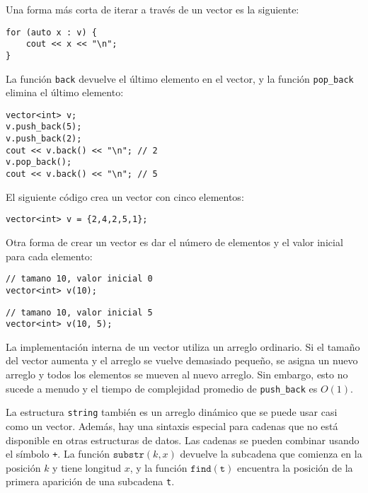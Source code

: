\begin{samepage}
Una forma más corta de iterar a través de un vector es la siguiente:

\begin{lstlisting}
for (auto x : v) {
    cout << x << "\n";
}
\end{lstlisting}
\end{samepage}

La función \texttt{back} devuelve el último elemento
en el vector, y
la función \texttt{pop\_back} elimina el último elemento:

\begin{lstlisting}
vector<int> v;
v.push_back(5);
v.push_back(2);
cout << v.back() << "\n"; // 2
v.pop_back();
cout << v.back() << "\n"; // 5
\end{lstlisting}

El siguiente código crea un vector con cinco elementos:

\begin{lstlisting}
vector<int> v = {2,4,2,5,1};
\end{lstlisting}

Otra forma de crear un vector es dar el número
de elementos y el valor inicial para cada elemento:

\begin{lstlisting}
// tamano 10, valor inicial 0
vector<int> v(10);
\end{lstlisting}
\begin{lstlisting}
// tamano 10, valor inicial 5
vector<int> v(10, 5);
\end{lstlisting}

La implementación interna de un vector
utiliza un arreglo ordinario.
Si el tamaño del vector aumenta y
el arreglo se vuelve demasiado pequeño,
se asigna un nuevo arreglo y todos los
elementos se mueven al nuevo arreglo.
Sin embargo, esto no sucede a menudo y el
tiempo de complejidad promedio de
\texttt{push\_back} es $O(1)$.


La estructura \texttt{string}
también es un arreglo dinámico que se puede usar casi como un vector.
Además, hay una sintaxis especial para cadenas
que no está disponible en otras estructuras de datos.
Las cadenas se pueden combinar usando el símbolo \texttt{+}.
La función $\texttt{substr}(k,x)$ devuelve la subcadena
que comienza en la posición $k$ y tiene longitud $x$,
y la función $\texttt{find}(\texttt{t})$ encuentra la posición
de la primera aparición de una subcadena \texttt{t}.

